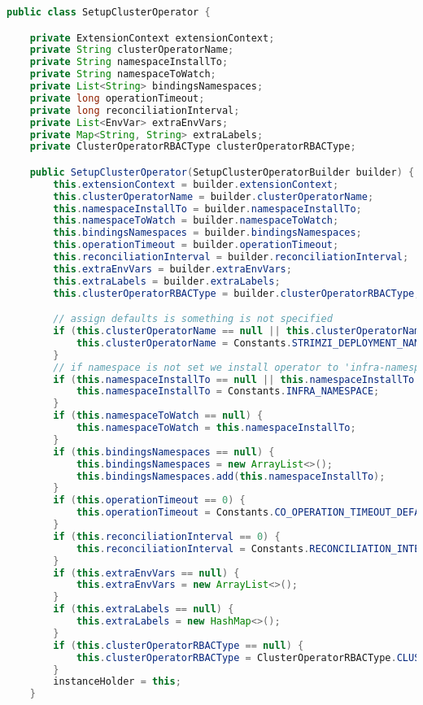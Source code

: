 \begin{lstlisting}[language=Java,label=cluster:operator:builder:pattern,caption=Cluster Operator builder pattern,frame=tb]
public class SetupClusterOperator {

    private ExtensionContext extensionContext;
    private String clusterOperatorName;
    private String namespaceInstallTo;
    private String namespaceToWatch;
    private List<String> bindingsNamespaces;
    private long operationTimeout;
    private long reconciliationInterval;
    private List<EnvVar> extraEnvVars;
    private Map<String, String> extraLabels;
    private ClusterOperatorRBACType clusterOperatorRBACType;

    public SetupClusterOperator(SetupClusterOperatorBuilder builder) {
        this.extensionContext = builder.extensionContext;
        this.clusterOperatorName = builder.clusterOperatorName;
        this.namespaceInstallTo = builder.namespaceInstallTo;
        this.namespaceToWatch = builder.namespaceToWatch;
        this.bindingsNamespaces = builder.bindingsNamespaces;
        this.operationTimeout = builder.operationTimeout;
        this.reconciliationInterval = builder.reconciliationInterval;
        this.extraEnvVars = builder.extraEnvVars;
        this.extraLabels = builder.extraLabels;
        this.clusterOperatorRBACType = builder.clusterOperatorRBACType;

        // assign defaults is something is not specified
        if (this.clusterOperatorName == null || this.clusterOperatorName.isEmpty()) {
            this.clusterOperatorName = Constants.STRIMZI_DEPLOYMENT_NAME;
        }
        // if namespace is not set we install operator to 'infra-namespace'
        if (this.namespaceInstallTo == null || this.namespaceInstallTo.isEmpty()) {
            this.namespaceInstallTo = Constants.INFRA_NAMESPACE;
        }
        if (this.namespaceToWatch == null) {
            this.namespaceToWatch = this.namespaceInstallTo;
        }
        if (this.bindingsNamespaces == null) {
            this.bindingsNamespaces = new ArrayList<>();
            this.bindingsNamespaces.add(this.namespaceInstallTo);
        }
        if (this.operationTimeout == 0) {
            this.operationTimeout = Constants.CO_OPERATION_TIMEOUT_DEFAULT;
        }
        if (this.reconciliationInterval == 0) {
            this.reconciliationInterval = Constants.RECONCILIATION_INTERVAL;
        }
        if (this.extraEnvVars == null) {
            this.extraEnvVars = new ArrayList<>();
        }
        if (this.extraLabels == null) {
            this.extraLabels = new HashMap<>();
        }
        if (this.clusterOperatorRBACType == null) {
            this.clusterOperatorRBACType = ClusterOperatorRBACType.CLUSTER;
        }
        instanceHolder = this;
    }


\end{lstlisting}
